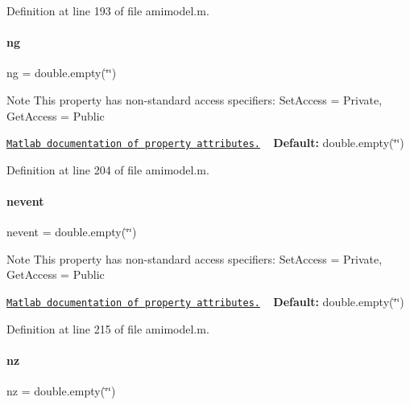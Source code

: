 Definition at line 193 of file amimodel.\+m.

\mbox{\label{classamimodel_a436ae5c63852a2df5372ebffaa35161c}} 
\paragraph{\texorpdfstring{ng}{ng}}
{\footnotesize\ttfamily ng = double.\+empty(\char`\"{}\char`\"{})}

\begin{DoxyNote}{Note}
This property has non-\/standard access specifiers\+: {\ttfamily Set\+Access = Private, Get\+Access = Public} 

\href{http://www.mathworks.com/help/matlab/matlab_oop/property-attributes.html}{\tt Matlab documentation of property attributes.} ~\newline
{\bfseries Default\+:} double.\+empty(\char`\"{}\char`\"{}) 
\end{DoxyNote}


Definition at line 204 of file amimodel.\+m.

\mbox{\label{classamimodel_aab5c7f06273122b68624eb3bca6a9b6e}} 
\paragraph{\texorpdfstring{nevent}{nevent}}
{\footnotesize\ttfamily nevent = double.\+empty(\char`\"{}\char`\"{})}

\begin{DoxyNote}{Note}
This property has non-\/standard access specifiers\+: {\ttfamily Set\+Access = Private, Get\+Access = Public} 

\href{http://www.mathworks.com/help/matlab/matlab_oop/property-attributes.html}{\tt Matlab documentation of property attributes.} ~\newline
{\bfseries Default\+:} double.\+empty(\char`\"{}\char`\"{}) 
\end{DoxyNote}


Definition at line 215 of file amimodel.\+m.

\mbox{\label{classamimodel_a79f11413e5bfe18a0e71e17574399ad5}} 
\paragraph{\texorpdfstring{nz}{nz}}
{\footnotesize\ttfamily nz = double.\+empty(\char`\"{}\char`\"{})}

